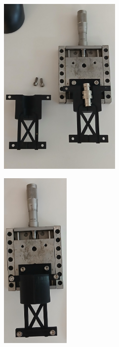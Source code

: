 \begin{figure}[!ht]
	\begin{minipage}[c]{0.5\textwidth} %
			\begin{subfigure}{\textwidth}
				\centering
				\includegraphics[height=250pt]{Figures/21_04_2025/Vista_frontal_impresa.jpg}
				\captionsetup{width=0.8\textwidth}
			\end{subfigure}
		\end{minipage}\begin{minipage}[c]{0.2\textwidth} %
			\begin{subfigure}{\textwidth}
				\centering
				\includegraphics[height=250pt]{Figures/21_04_2025/Vista_frontal_completa_imrpesa.jpg}
				\captionsetup{width=0.8\textwidth}
			\end{subfigure}
		\end{minipage}\begin{minipage}[c]{0.293054\textwidth} %

\end{minipage}
\end{figure}
